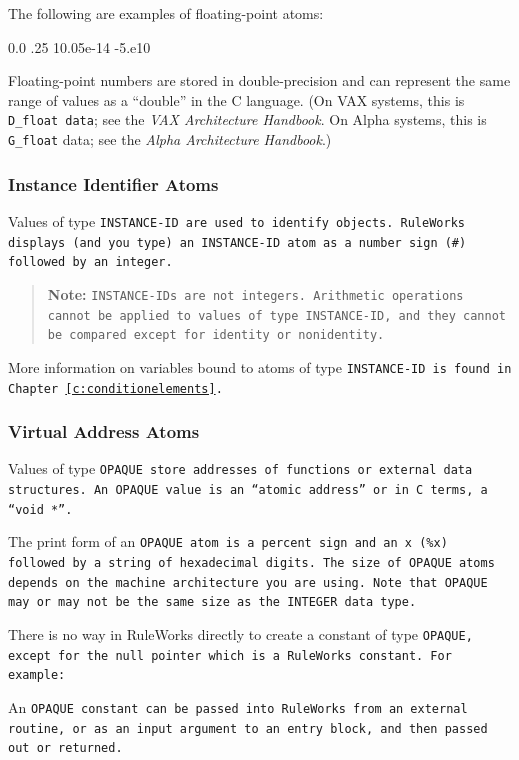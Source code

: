 The following are examples of floating-point atoms:
\begin{qv}
0.0
.25
10.05e-14
-5.e10
\end{qv}
Floating-point numbers are stored in double-precision and can
represent the same range of values as a ``double'' in the C
language. (On VAX systems, this is \verb|D_float data|; see the
\emph{VAX Architecture Handbook}. On Alpha systems, this is
\verb|G_float| data; see the \emph{Alpha Architecture Handbook}.)

\subsubsection{Instance Identifier Atoms}

Values of type \tt{INSTANCE-ID} are used to identify objects.
RuleWorks displays (and you type) an \tt{INSTANCE-ID} atom as a number
sign (\verb|#|) followed by an integer.

\begin{quote}
  \textbf{Note:} \tt{INSTANCE-ID}s are not integers. Arithmetic
  operations cannot be applied to values of type \tt{INSTANCE-ID}, and
  they cannot be compared except for identity or nonidentity.
\end{quote}

More information on variables bound to atoms of type \tt{INSTANCE-ID}
is found in Chapter~\ref{c:conditionelements}.

\subsubsection{Virtual Address Atoms}

Values of type \tt{OPAQUE} store addresses of functions or
external data structures. An \tt{OPAQUE} value is an ``atomic
address'' or in C terms, a ``void *''.

The print form of an \tt{OPAQUE} atom is a percent sign and an \verb|x|
(\verb|%x|) followed by a string of hexadecimal digits. The size of
\tt{OPAQUE} atoms depends on the machine architecture you are
using. Note that \tt{OPAQUE} may or may not be the same size as
the \tt{INTEGER} data type.

There is no way in RuleWorks directly to create a constant of
type \tt{OPAQUE}, except for the null pointer which is a RuleWorks
constant. For example:
\begin{qv}
\end{qv}
An \tt{OPAQUE} constant can be passed into RuleWorks from an
external routine, or as an input argument to an entry block,
and then passed out or returned.

